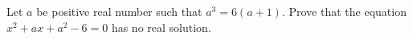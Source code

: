 Let $a$ be positive real number such that $a^{3}=6(a+1)$. Prove that the equation $x^{2}+ax+a^{2}-6=0$ has no real solution.